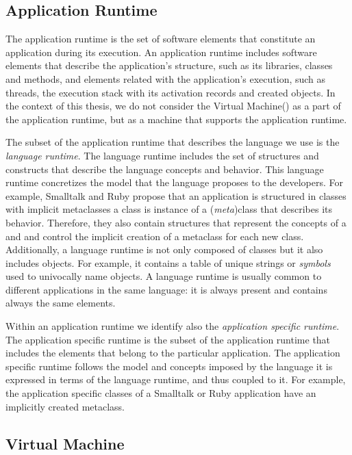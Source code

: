 \subsection{Application Runtime}

The application runtime is the set of software elements that constitute an application during its execution. An application runtime includes software elements that describe the application's structure, such as its libraries, classes and methods, and elements related with the application's execution, such as threads, the execution stack with its activation records and created objects. In the context of this thesis, we do not consider the Virtual Machine(\VM) as a part of the application runtime, but as a machine that supports the application runtime.

The subset of the application runtime that describes the language we use is the \emph{language runtime}. The language runtime includes the set of structures and constructs that describe the language concepts and behavior. This language runtime concretizes the model that the language proposes to the developers. For example, Smalltalk and Ruby propose that an application is structured in classes with implicit metaclasses \ie a class is instance of a (\emph{meta})class that describes its behavior. Therefore, they also contain structures that represent the concepts of a  and  and control the implicit creation of a metaclass for each new class. Additionally, a language runtime is not only composed of classes but it also includes objects. For example, it contains a table of unique strings or \emph{symbols} used to univocally name objects. A language runtime is usually common to different applications in the same language: it is always present and contains always the same elements.

Within an application runtime we identify also the \emph{application specific runtime}. The application specific runtime is the subset of the application runtime that includes the elements that belong to the particular application. The application specific runtime follows the model and concepts imposed by the language \ie it is expressed in terms of the language runtime, and thus coupled to it. For example, the application specific classes of a Smalltalk or Ruby application have an implicitly created metaclass.

\subsection{Virtual Machine}

